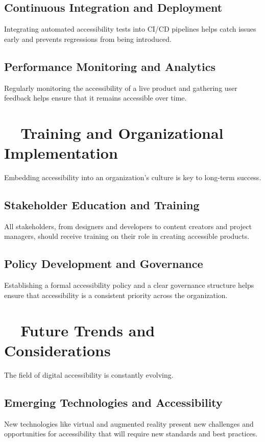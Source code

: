 \subsection{Continuous Integration and Deployment}
\label{subsec:ci-cd}
Integrating automated accessibility tests into CI/CD pipelines helps catch issues early and prevents regressions from being introduced.
\supercite{Fowler2013}

\subsection{Performance Monitoring and Analytics}
\label{subsec:performance-analytics}
Regularly monitoring the accessibility of a live product and gathering user feedback helps ensure that it remains accessible over time.

\section{~~Training and Organizational Implementation}
\label{sec:training-implementation}
Embedding accessibility into an organization's culture is key to long-term success.

\subsection{Stakeholder Education and Training}
\label{subsec:stakeholder-training}
All stakeholders, from designers and developers to content creators and project managers, should receive training on their role in creating accessible products.
\supercite{PEATTraining}

\subsection{Policy Development and Governance}
\label{subsec:policy-governance}
Establishing a formal accessibility policy and a clear governance structure helps ensure that accessibility is a consistent priority across the organization.
\supercite{Lazar2015}

\section{~~Future Trends and Considerations}
\label{sec:future-trends}
The field of digital accessibility is constantly evolving.

\subsection{Emerging Technologies and Accessibility}
\label{subsec:emerging-tech-a11y}
New technologies like virtual and augmented reality present new challenges and opportunities for accessibility that will require new standards and best practices.
\supercite{W3CEmergingTechA11y}

